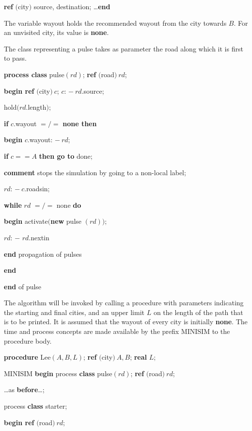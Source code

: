\quad \quad \textbf{ref} $($city$)$ source, destination; \dots \textbf{end}

\noindent
The variable wayout holds the recommended wayout from the city towards $B$. For an unvisited city, its value is \textbf{none}.

The class representing a pulse takes as parameter the road along which it is first to pass.

\quad \textbf{process class} pulse$(rd)$; \textbf{ref} $($road$)\ rd$;

\quad \textbf{begin ref} $($city$)\ c$; $c$: $-\ rd$.source;

\quad \quad hold$(rd$.length$)$;

\quad \quad \textbf{if} $c$.wayout $=/=$ \textbf{none then}

\quad \quad \textbf{begin} $c$.wayout: $-\ rd$;

\quad \quad \quad \textbf{if} $c == A$ \textbf{then go to} done;

\quad \quad \quad \textbf{comment} stops the simulation by going to a non-local label;

\quad \quad \quad $rd$: $-\ c$.roadsin;

\quad \quad \quad \textbf{while} $rd$ $=/=$ none \textbf{do}

\quad \quad \quad \textbf{begin} activate$($\textbf{new} pulse $(rd));$

\quad \quad \quad \quad $rd$: $-$ $rd$.nextin

\quad \quad \quad \textbf{end} propagation of pulses

\quad \quad \textbf{end}

\quad \textbf{end} of pulse

The algorithm will be invoked by calling a procedure with parameters indicating the starting and final cities, and an upper limit $L$ on the length of the path that is to be printed. It is assumed that the wayout of every city is initially \textbf{none}. The time and process concepts are made available by the prefix MINISIM to the procedure body.

\quad \textbf{procedure} Lee$(A, B, L)$; \textbf{ref} $($city$)\ A, B$; \textbf{real} $L$;

\quad \quad MINISIM \textbf{begin} process \textbf{class} pulse$(rd)$; \textbf{ref} $($road$)\ rd$;

\quad \quad \quad \dots as \textbf{before}\dots;

\quad \quad \quad process \textbf{class} starter;

\quad \quad \quad \quad \textbf{begin ref} $($road$)\ rd$;

